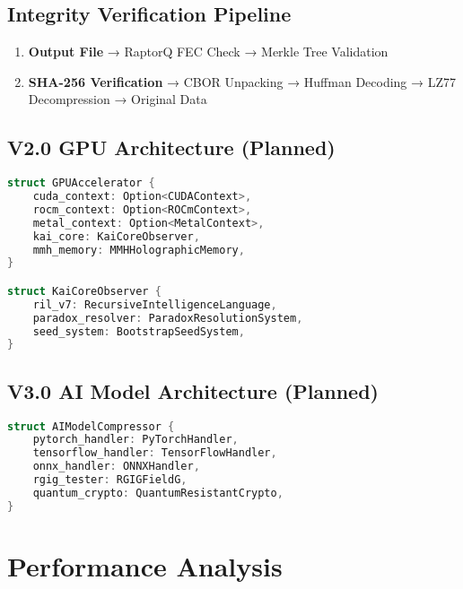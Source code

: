 \documentclass[12pt,a4paper]{article}
\begin{document}
\subsection{Integrity Verification Pipeline}
\begin{enumerate}
    \item \textbf{Output File} → RaptorQ FEC Check → Merkle Tree Validation
    \item \textbf{SHA-256 Verification} → CBOR Unpacking → Huffman Decoding → LZ77 Decompression → Original Data
\end{enumerate}

\subsection{V2.0 GPU Architecture (Planned)}
\begin{lstlisting}[language=C, caption=GPU Accelerator Structure]
struct GPUAccelerator {
    cuda_context: Option<CUDAContext>,
    rocm_context: Option<ROCmContext>,
    metal_context: Option<MetalContext>,
    kai_core: KaiCoreObserver,
    mmh_memory: MMHHolographicMemory,
}

struct KaiCoreObserver {
    ril_v7: RecursiveIntelligenceLanguage,
    paradox_resolver: ParadoxResolutionSystem,
    seed_system: BootstrapSeedSystem,
}
\end{lstlisting}

\subsection{V3.0 AI Model Architecture (Planned)}
\begin{lstlisting}[language=C, caption=AI Model Compressor Structure]
struct AIModelCompressor {
    pytorch_handler: PyTorchHandler,
    tensorflow_handler: TensorFlowHandler,
    onnx_handler: ONNXHandler,
    rgig_tester: RGIGFieldG,
    quantum_crypto: QuantumResistantCrypto,
}
\end{lstlisting}

\newpage

\section{Performance Analysis}
\end{document}
